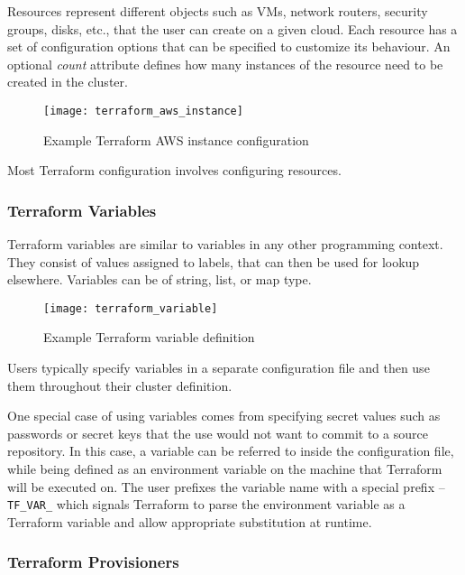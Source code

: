 Resources represent different objects such as VMs, network routers, security groups, disks, etc., that the user can create on a given cloud. Each resource has a set of configuration options that can be specified to customize its behaviour. An optional \emph{count} attribute defines how many instances of the resource need to be created in the cluster.

\begin{figure}[h]
\texttt{[image: terraform\_aws\_instance]}
\centering
\caption {Example Terraform AWS instance configuration}
\label{fig:terraform_aws_instance}
\end{figure}

Most Terraform configuration involves configuring resources.

\subsubsection {Terraform Variables}

Terraform variables are similar to variables in any other programming context. They consist of values assigned to labels, that can then be used for lookup elsewhere. Variables can be of string, list, or map type.

\begin{figure}[h]
\texttt{[image: terraform\_variable]}
\centering
\caption {Example Terraform variable definition}
\label{fig:terraform_variable}
\end{figure}

Users typically specify variables in a separate configuration file and then use them throughout their cluster definition. 

One special case of using variables comes from specifying secret values such as passwords or secret keys that the use would not want to commit to a source repository. In this case, a variable can be referred to inside the configuration file, while being defined as an environment variable on the machine that Terraform will be executed on. The user prefixes the variable name with a special prefix -- \texttt{TF\_VAR\_} which signals Terraform to parse the environment variable as a Terraform variable and allow appropriate substitution at runtime.

\subsubsection {Terraform Provisioners}

